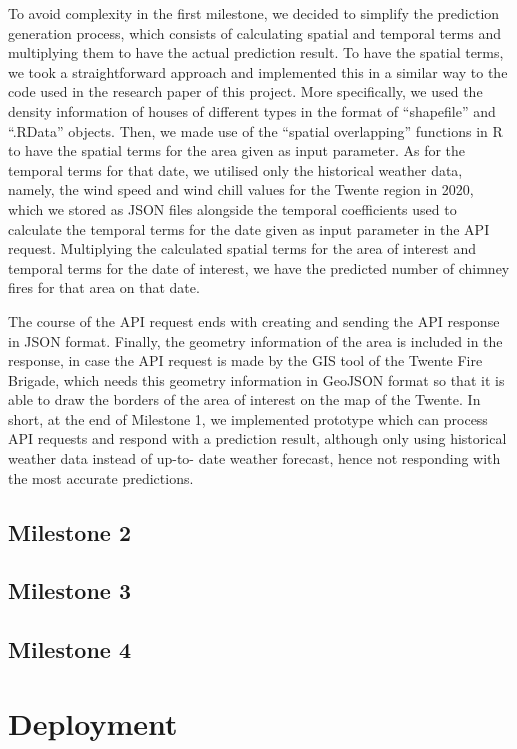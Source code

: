 \documentclass{utitcphd_overleaf}
\begin{document}
To avoid complexity in the first milestone, we decided to simplify the prediction generation process, which consists of calculating spatial and temporal terms and multiplying them to have the actual prediction result. To have the spatial terms, we took a straightforward approach and implemented this in a similar way to the code used in the research paper of this project. More specifically, we used the density information of houses of different types in the format of “shapefile” and “.RData” objects. Then, we made use of the “spatial overlapping” functions in R to have the spatial terms for the area given as input parameter. As for the temporal terms for that date, we utilised only the historical weather data, namely, the wind speed and wind chill values for the Twente region in 2020, which we stored as JSON files alongside the temporal coefficients used to calculate the temporal terms for the date given as input parameter in the API request. Multiplying the calculated spatial terms for the area of interest and temporal terms for the date of interest, we have the predicted number of chimney fires for that area on that date.

The course of the API request ends with creating and sending the API response in JSON format. Finally, the geometry information of the area is included in the response, in case the API request is made by the GIS tool of the Twente Fire Brigade, which needs this geometry information in GeoJSON format so that it is able to draw the borders of the area of interest on the map of the Twente. In short, at the end of Milestone 1, we implemented prototype which can process API requests and respond with a prediction result, although only using historical weather data instead of up-to- date weather forecast, hence not responding with the most accurate predictions.

\subsection{Milestone 2}
\subsection{Milestone 3}
\subsection{Milestone 4}

\section{Deployment}
\end{document}
